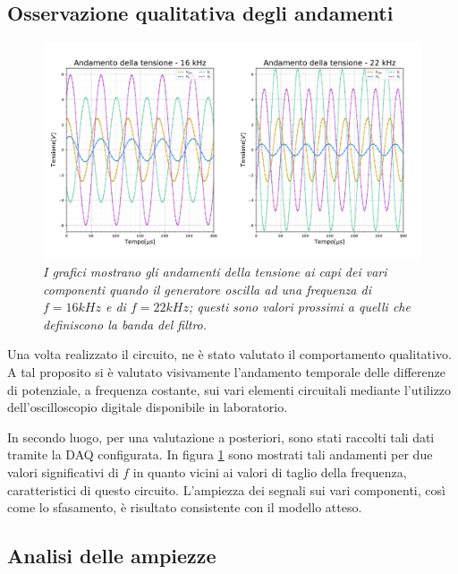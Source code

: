 \subsection{Osservazione qualitativa degli andamenti}

\begin{figure}[h!]
    \centering
    \includegraphics[width=1\textwidth]{../figs/tensione-tempo.pdf}
    \caption{\emph{I grafici mostrano gli andamenti della tensione ai capi dei vari componenti quando il generatore
    oscilla ad una frequenza di $f=16kHz$ e di $f=22kHz$; questi sono valori prossimi a quelli che definiscono la banda del filtro.}}
    \label{fig:tensione-tempo}
\end{figure}


Una volta realizzato il circuito, ne è stato valutato il comportamento qualitativo. A tal proposito si è valutato visivamente
l'andamento temporale delle differenze di potenziale, a frequenza costante, sui vari elementi circuitali mediante
l'utilizzo dell'oscilloscopio digitale disponibile in laboratorio.

In secondo luogo, per una valutazione a posteriori, sono stati raccolti tali dati tramite la DAQ configurata.
In figura \ref{fig:tensione-tempo} sono mostrati tali andamenti per due valori significativi di $f$ in quanto vicini ai
valori di taglio della frequenza, caratteristici di questo circuito.
L'ampiezza dei segnali sui vari componenti, così come lo sfasamento, è risultato consistente con il modello atteso.

\subsection{Analisi delle ampiezze}

